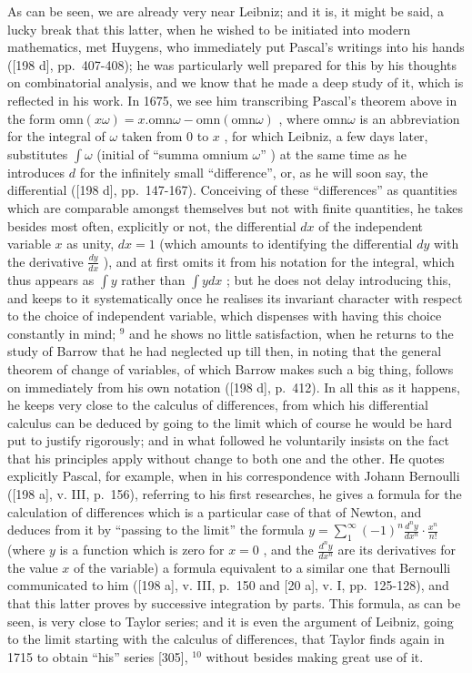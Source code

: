 As can be seen, we are already very near Leibniz; and it is, it might be said, a lucky break that this latter, when he wished to be initiated into modern mathematics, met Huygens, who immediately put Pascal's writings into his hands ({[}198 d{]}, pp.~407-408); he was particularly well prepared for this by his thoughts on combinatorial analysis, and we know that he made a deep study of it, which is reflected in his work. In 1675, we see him transcribing Pascal's theorem above in the form \(\mathrm{omn}(x\omega) = x . \mathrm{omn}\omega - \mathrm{omn}(\mathrm{omn}\omega)\) , where \(\mathrm{omn}\omega\) is an abbreviation for the integral of \(\omega\) taken from 0 to \(x\) , for which Leibniz, a few days later, substitutes \(\int \omega\) (initial of ``summa omnium \(\omega\)'' ) at the same time as he introduces \(d\) for the infinitely small ``difference'', or, as he will soon say, the differential ({[}198 d{]}, pp.~147-167). Conceiving of these ``differences'' as quantities which are comparable amongst themselves but not with finite quantities, he takes besides most often, explicitly or not, the differential \(dx\) of the independent variable \(x\) as unity, \(dx = 1\) (which amounts to identifying the differential \(dy\) with the derivative \(\frac{dy}{dx}\) ), and at first omits it from his notation for the integral, which thus appears as \(\int y\) rather than \(\int ydx\) ; but he does not delay introducing this, and keeps to it systematically once he realises its invariant character with respect to the choice of independent variable, which dispenses with having this choice constantly in mind; \(^{9}\) and he shows no little satisfaction, when he returns to the study of Barrow that he had neglected up till then, in noting that the general theorem of change of variables, of which Barrow makes such a big thing, follows on immediately from his own notation ({[}198 d{]}, p.~412). In all this as it happens, he keeps very close to the calculus of differences, from which his differential calculus can be deduced by going to the limit which of course he would be hard put to justify rigorously; and in what followed he voluntarily insists on the fact that his principles apply without change to both one and the other. He quotes explicitly Pascal, for example, when in his correspondence with Johann Bernoulli ({[}198 a{]}, v. III, p.~156), referring to his first researches, he gives a formula for the calculation of differences which is a particular case of that of Newton, and deduces from it by ``passing to the limit'' the formula \(y = \sum_{1}^{\infty} (-1)^{n} \frac{d^{n}y}{dx^{n}} \cdot \frac{x^{n}}{n!}\) (where \(y\) is a function which is zero for \(x = 0\) , and the \(\frac{d^{n}y}{dx^{n}}\) are its derivatives for the value \(x\) of the variable) a formula equivalent to a similar one that Bernoulli communicated to him ({[}198 a{]}, v. III, p.~150 and {[}20 a{]}, v. I, pp.~125-128), and that this latter proves by successive integration by parts. This formula, as can be seen, is very close to Taylor series; and it is even the argument of Leibniz, going to the limit starting with the calculus of differences, that Taylor finds again in 1715 to obtain ``his'' series {[}305{]}, \(^{10}\) without besides making great use of it.

